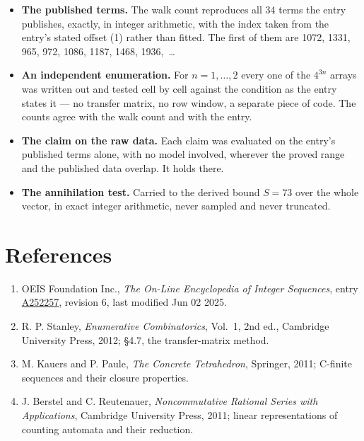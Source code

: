\documentclass[11pt]{article}
\theoremstyle{definition}
\begin{document}
\begin{itemize}

\item {\bfseries The published terms.} The walk count reproduces all 34 terms the entry publishes, exactly, in integer arithmetic, with the index taken from the entry's stated offset (1) rather than fitted. The first of them are 1072, 1331, 965, 972, 1086, 1187, 1468, 1936,~\dots

\item {\bfseries An independent enumeration.} For $n = 1,\dots,2$ every one of the $4^{3n}$ arrays was written out and tested cell by cell against the condition as the entry states it --- no transfer matrix, no row window, a separate piece of code. The counts agree with the walk count and with the entry.

\item {\bfseries The claim on the raw data.} Each claim was evaluated on the entry's published terms alone, with no model involved, wherever the proved range and the published data overlap. It holds there.

\item {\bfseries The annihilation test.} Carried to the derived bound $S = 73$ over the whole vector, in exact integer arithmetic, never sampled and never truncated.

\end{itemize}

\section{References}

\begin{enumerate}

\item OEIS Foundation Inc., \emph{The On-Line Encyclopedia of Integer Sequences}, entry \href{https://oeis.org/A252257}{A252257}, revision 6, last modified Jun 02 2025.

\item R. P. Stanley, \emph{Enumerative Combinatorics}, Vol.~1, 2nd ed., Cambridge University Press, 2012; \S4.7, the transfer-matrix method.

\item M. Kauers and P. Paule, \emph{The Concrete Tetrahedron}, Springer, 2011; C-finite sequences and their closure properties.

\item J. Berstel and C. Reutenauer, \emph{Noncommutative Rational Series with Applications}, Cambridge University Press, 2011; linear representations of counting automata and their reduction.

\end{enumerate}
\end{document}
